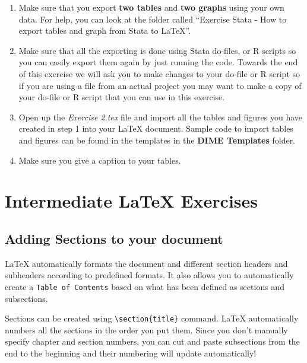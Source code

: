 \documentclass[12pts]{article}
\begin{document}
\begin{minipage}{\textwidth}
	\begin{enumerate}
		\item Make sure that you export \textbf{two tables} and \textbf{two graphs} using your own data. For help, you can look at the folder called ``Exercise Stata - How to export tables and graph from Stata to LaTeX''.
		\item Make sure that all the exporting is done using Stata do-files, or R scripts so you can easily export them again by just running the code. Towards the end of this exercise we will ask you to make changes to your do-file or R script so if you are using a file from an actual project you may want to make a copy of your do-file or R script that you can use in this exercise.
		\item Open up the \textit{Exercise 2.tex} file and import all the tables and figures you have created in step 1 into your {\LaTeX} document. Sample code to import tables and figures can be found in the templates in the \textbf{DIME Templates} folder.
		\item Make sure you give a caption to your tables. 
	\end{enumerate}
	\end{minipage}
	
	
	\section{Intermediate {\LaTeX} Exercises}
	\subsection{Adding Sections to your document}
	{\LaTeX} automatically formats the document and different section headers and subheaders according to predefined formats. It also allows you to automatically create a \texttt{Table of Contents} based on what has been defined as sections and subsections. 
	
	Sections can be created using \verb|\section{title}| command. {\LaTeX} automatically numbers all the sections in the order you put them. Since you don't manually specify chapter and section numbers, you can cut and paste subsections from the end to the beginning and their numbering will update automatically! 
	
\end{document}

